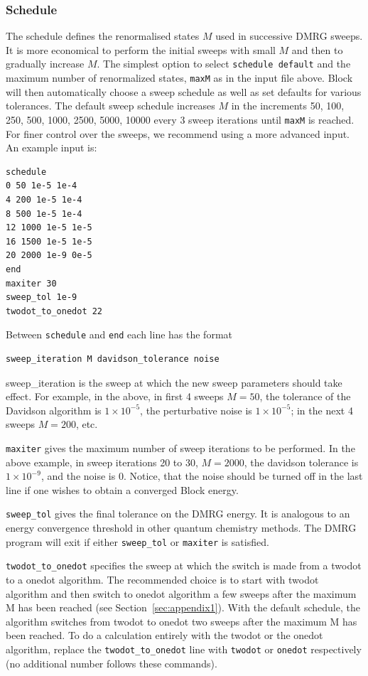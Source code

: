 \documentclass[letterpaper,12pt,aps, pra]{revtex4-1}
\begin{document}
\subsubsection{Schedule}
The schedule defines the renormalised states $M$ used in successive DMRG sweeps. It is more economical to perform the initial sweeps with small $M$ and
then to gradually increase $M$. The simplest option to select \texttt{schedule default} and the maximum number of renormalized states, \texttt{maxM} as in the
input file above. Block
will then automatically choose a sweep schedule as well as set defaults for various tolerances. The default sweep schedule increases $M$ in 
the increments 50, 100, 250, 500, 1000, 2500, 5000, 10000 every 3 sweep iterations until \texttt{maxM} is reached.
For finer control over the sweeps, we recommend using a more advanced input. An example input is:
\begin{verbatim}
schedule 
0 50 1e-5 1e-4
4 200 1e-5 1e-4
8 500 1e-5 1e-4
12 1000 1e-5 1e-5
16 1500 1e-5 1e-5
20 2000 1e-9 0e-5
end
maxiter 30
sweep_tol 1e-9
twodot_to_onedot 22
\end{verbatim}

Between \texttt{schedule} and \texttt{end} each line
has the format
\begin{verbatim}
sweep_iteration M davidson_tolerance noise
\end{verbatim}
sweep\_iteration is the sweep at which the new sweep parameters should take effect. For example, in the above, in  first 4 sweeps $M=50$, the tolerance of the Davidson algorithm is $1\times 10^{-5}$, the perturbative  noise is $1 \times 10^{-5}$; in the next 4 sweeps $M=200$, etc.

\texttt{maxiter} gives the maximum number of sweep iterations to be performed. In the above example, in sweep iterations 20 to 30, $M=2000$, the davidson tolerance is $1\times 10^{-9}$, and the noise is 0. Notice, that the noise should be turned off in the last line if one wishes to obtain a converged Block energy.

\texttt{sweep\_tol} gives the final tolerance on the DMRG energy. It is analogous to an energy convergence threshold in other quantum chemistry methods. 
The DMRG program will exit if either \texttt{sweep\_tol} or \texttt{maxiter} is satisfied.

\texttt{twodot\_to\_onedot} specifies the sweep at which the switch is made from a twodot to a onedot algorithm. The recommended choice is to 
start with twodot algorithm and then switch to onedot algorithm a few sweeps after the maximum M has been reached (see Section~\ref{sec:appendix1}). 
With the default schedule, the algorithm switches from twodot to onedot two sweeps after the maximum M has been reached. 
To do a calculation entirely with the twodot or the onedot algorithm, replace the \texttt{twodot\_to\_onedot} line with \texttt{twodot}
or \texttt{onedot} respectively (no additional number follows these commands). 
\end{document}

